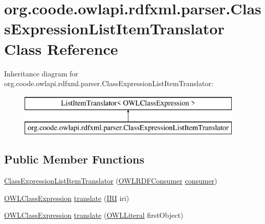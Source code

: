 \hypertarget{classorg_1_1coode_1_1owlapi_1_1rdfxml_1_1parser_1_1_class_expression_list_item_translator}{\section{org.\-coode.\-owlapi.\-rdfxml.\-parser.\-Class\-Expression\-List\-Item\-Translator Class Reference}
\label{classorg_1_1coode_1_1owlapi_1_1rdfxml_1_1parser_1_1_class_expression_list_item_translator}
}
Inheritance diagram for org.\-coode.\-owlapi.\-rdfxml.\-parser.\-Class\-Expression\-List\-Item\-Translator\-:\begin{figure}[H]
\begin{center}
\leavevmode
\includegraphics[height=2.000000cm]{classorg_1_1coode_1_1owlapi_1_1rdfxml_1_1parser_1_1_class_expression_list_item_translator}
\end{center}
\end{figure}
\subsection*{Public Member Functions}
\begin{DoxyCompactItemize}
\item 
\hyperlink{classorg_1_1coode_1_1owlapi_1_1rdfxml_1_1parser_1_1_class_expression_list_item_translator_a0034d60cf9a0809c46123e25b17e68c1}{Class\-Expression\-List\-Item\-Translator} (\hyperlink{classorg_1_1coode_1_1owlapi_1_1rdfxml_1_1parser_1_1_o_w_l_r_d_f_consumer}{O\-W\-L\-R\-D\-F\-Consumer} \hyperlink{classorg_1_1coode_1_1owlapi_1_1rdfxml_1_1parser_1_1_class_expression_list_item_translator_add0c11b41dbb6f2c08059fef24b77c8a}{consumer})
\item 
\hyperlink{interfaceorg_1_1semanticweb_1_1owlapi_1_1model_1_1_o_w_l_class_expression}{O\-W\-L\-Class\-Expression} \hyperlink{classorg_1_1coode_1_1owlapi_1_1rdfxml_1_1parser_1_1_class_expression_list_item_translator_a8325fc79347249c83158633243e5f30c}{translate} (\hyperlink{classorg_1_1semanticweb_1_1owlapi_1_1model_1_1_i_r_i}{I\-R\-I} iri)
\item 
\hyperlink{interfaceorg_1_1semanticweb_1_1owlapi_1_1model_1_1_o_w_l_class_expression}{O\-W\-L\-Class\-Expression} \hyperlink{classorg_1_1coode_1_1owlapi_1_1rdfxml_1_1parser_1_1_class_expression_list_item_translator_aa9d409cb0e6ab79ea650c5349c46cded}{translate} (\hyperlink{interfaceorg_1_1semanticweb_1_1owlapi_1_1model_1_1_o_w_l_literal}{O\-W\-L\-Literal} first\-Object)
\end{DoxyCompactItemize}
